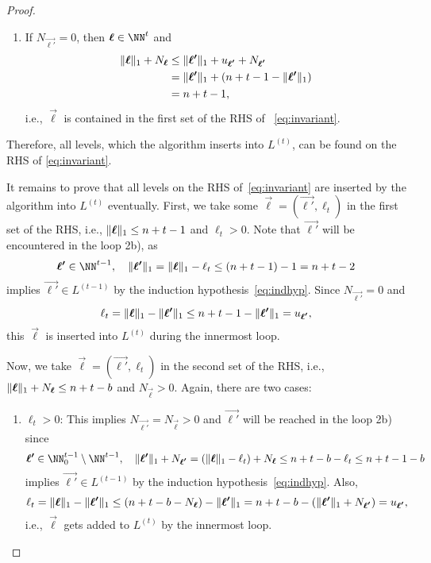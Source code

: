 \begin{proof}
\begin{enumerate}
    \item
    If $N_{\vec{\ell'}} = 0$, then $\vec{\ell} \in \NN^t$ and
    \begin{align*}
    \lVert{{\boldsymbol{\ell}}}\rVert_1 + N_{{\boldsymbol{\ell}}}
    &\le \lVert{{\boldsymbol{\ell'}}}\rVert_1 + u_{{\boldsymbol{\ell'}}} + N_{{\boldsymbol{\ell'}}}\\
    &= \lVert{{\boldsymbol{\ell'}}}\rVert_1 +
    \left(n + t - 1 - \lVert{{\boldsymbol{\ell'}}}\rVert_1\right)\\
    &= n + t - 1,
    \end{align*}
    i.e., $\vec{\ell}$ is contained in the first set of the RHS of~%
    \eqref{eq:invariant}.
  \end{enumerate}
  Therefore, all levels, which the algorithm inserts into $L^{(t)}$,
  can be found on the RHS of \eqref{eq:invariant}.
  
  It remains to prove that all levels on the RHS of~\eqref{eq:invariant}
  are inserted by the algorithm into $L^{(t)}$ eventually.
  First, we take some $\vec{\ell} = (\vec{\ell'}, \ell_t)$
  in the first set of the RHS,
  i.e., $\lVert{{\boldsymbol{\ell}}}\rVert_1 \le n + t - 1$ and $\ell_t > 0$.
  Note that $\vec{\ell'}$ will be encountered in the loop 2b), as
  \begin{equation*}
  \vec{\ell'} \in \NN^{t-1},\quad
  \norm{\vec{\ell'}}_1
  = \norm{\vec{\ell}}_1 - \ell_t
  \le (n+t-1) - 1
  = n + t - 2
  \end{equation*}
  implies $\vec{\ell'} \in L^{(t-1)}$ by the induction
  hypothesis~\eqref{eq:indhyp}.
  Since $N_{\vec{\ell'}} = 0$ and
  \begin{equation*}
  \ell_t
  = \lVert{{\boldsymbol{\ell}}}\rVert_1 - \lVert{{\boldsymbol{\ell'}}}\rVert_1
  \le n+t-1 - \lVert{{\boldsymbol{\ell'}}}\rVert_1
  = u_{{\boldsymbol{\ell'}}},
  \end{equation*}
  this $\vec{\ell}$ is inserted into $L^{(t)}$ during the innermost loop.
  
  Now, we take $\vec{\ell} = (\vec{\ell'}, \ell_t)$
  in the second set of the RHS, i.e.,
  $\lVert{{\boldsymbol{\ell}}}\rVert_1 + N_{{\boldsymbol{\ell}}} \le n+t-b$ and
  $N_{\vec{\ell}} > 0$.
  Again, there are two cases:
  \begin{enumerate}
    \item
    $\ell_t > 0$:
    This implies $N_{\vec{\ell'}} = N_{\vec{\ell}} > 0$ and
    $\vec{\ell'}$ will be reached in the loop 2b) since
    \begin{equation*}
    \vec{\ell'} \in \NN_0^{t-1} \setminus \NN^{t-1},\quad
    \norm{\vec{\ell'}}_1 + N_{\vec{\ell'}}
    = (\norm{\vec{\ell}}_1 - \ell_t) + N_{\vec{\ell}}
    \le n+t-b-\ell_t
    \le n+t-1-b
    \end{equation*}
    implies $\vec{\ell'} \in L^{(t-1)}$ by the induction
    hypothesis~\eqref{eq:indhyp}.
    Also,
    \begin{equation*}
    \ell_t
    = \lVert{{\boldsymbol{\ell}}}\rVert_1 - \lVert{{\boldsymbol{\ell'}}}\rVert_1
    \le (n+t-b - N_{{\boldsymbol{\ell}}}) - \lVert{{\boldsymbol{\ell'}}}\rVert_1
    = n+t-b - (\lVert{{\boldsymbol{\ell'}}}\rVert_1 + N_{{\boldsymbol{\ell'}}})
    = u_{{\boldsymbol{\ell'}}},
    \end{equation*}
    i.e., $\vec{\ell}$ gets added to $L^{(t)}$
    by the innermost loop.
    

\end{enumerate}
\end{proof}
